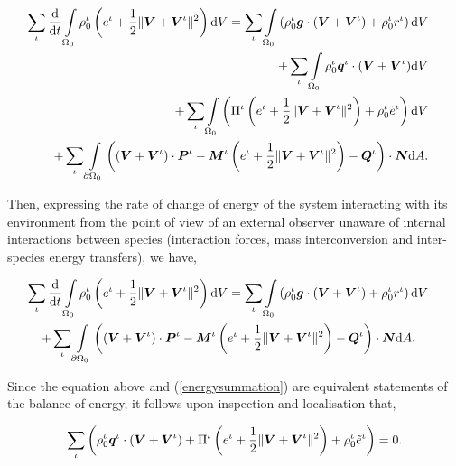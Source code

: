 \begin{eqnarray}
\sum\limits_{\iota}\frac{\mathrm{d}}{\mathrm{d}t}
\int\limits_{\Omega_0}\rho_0^\iota \left ( e^\iota + \frac{1}{2}
\Vert\mbox{\boldmath$ V$}+\mbox{\boldmath$ V$}^\iota\Vert^2 \right ) \mathrm{d}V =
\sum\limits_{\iota}\int\limits_{\Omega_0} \left(\rho_0^\iota\mbox{\boldmath$ g$}
\cdot\left(\mbox{\boldmath$ V$}+\mbox{\boldmath$ V$}^\iota\right) + \rho_0^\iota r^\iota
\right)\mathrm{d}V& &\nonumber\\ +
\sum\limits_{\iota}\int\limits_{\Omega_0}
\rho_0^\iota\mbox{\boldmath$ q$}^\iota\cdot(\mbox{\boldmath$ V$}+\mbox{\boldmath$ V$}^\iota)\mathrm{d}V& &\nonumber\\ +
\sum\limits_{\iota}\int\limits_{\Omega_0} \left(\Pi^\iota\left(e^\iota
+ \frac{1}{2}\Vert\mbox{\boldmath$ V$}+\mbox{\boldmath$ V$}^\iota\Vert^2\right) +
\rho^\iota_0\tilde{e}^\iota\right)\mathrm{d}V \label{energysummation}&
& \\ +\sum\limits_{\iota}\int\limits_{\partial
  \Omega_0}\left(\left(\mbox{\boldmath$ V$}+\mbox{\boldmath$ V$}^\iota\right)\cdot\mbox{\boldmath$ P$}^\iota -
\mbox{\boldmath$ M$}^\iota\left(e^\iota +\frac{1}{2} \Vert\mbox{\boldmath$ V$}+\mbox{\boldmath$ V$}^\iota\Vert^2\right) -
\mbox{\boldmath$ Q$}^\iota\right)\cdot\mbox{\boldmath$ N$}\mathrm{d}A.& & \nonumber
\end{eqnarray}

Then, expressing the rate of change of energy of the system
interacting with its environment from the point of view of an external
observer unaware of internal interactions between species (interaction
forces, mass interconversion and inter-species energy transfers), we
have,

\begin{eqnarray}
\sum\limits_{\iota}\frac{\mathrm{d}}{\mathrm{d}t}
\int\limits_{\Omega_0}\rho_0^\iota \left ( e^\iota + \frac{1}{2}
\Vert\mbox{\boldmath$ V$}+\mbox{\boldmath$ V$}^\iota\Vert^2 \right ) \mathrm{d}V =
\sum\limits_{\iota}\int\limits_{\Omega_0} \left(\rho_0^\iota\mbox{\boldmath$ g$}
\cdot\left(\mbox{\boldmath$ V$}+\mbox{\boldmath$ V$}^\iota\right) + \rho_0^\iota r^\iota
\right)\mathrm{d}V &
&\nonumber\\ +\sum\limits_{\iota}\int\limits_{\partial
  \Omega_0}\left(\left(\mbox{\boldmath$ V$}+\mbox{\boldmath$ V$}^\iota\right)\cdot\mbox{\boldmath$ P$}^\iota -
\mbox{\boldmath$ M$}^\iota\left(e^\iota +\frac{1}{2} \Vert\mbox{\boldmath$ V$}+\mbox{\boldmath$ V$}^\iota\Vert^2\right) -
\mbox{\boldmath$ Q$}^\iota\right)\cdot\mbox{\boldmath$ N$}\mathrm{d}A.\quad\nonumber& &
\end{eqnarray}

Since the equation above and (\ref{energysummation}) are equivalent
statements of the balance of energy, it follows upon inspection and
localisation that,

\begin{eqnarray}
\sum\limits_{\iota}\left(\rho_0^\iota\mbox{\boldmath$ q$}^\iota\cdot(\mbox{\boldmath$ V$}+\mbox{\boldmath$ V$}^\iota)
+ \Pi^\iota\left(e^\iota +
\frac{1}{2}\Vert\mbox{\boldmath$ V$}+\mbox{\boldmath$ V$}^\iota\Vert^2\right) +
\rho^\iota_0\tilde{e}^\iota\right) =
0. \label{energysummationresult}
\end{eqnarray}

